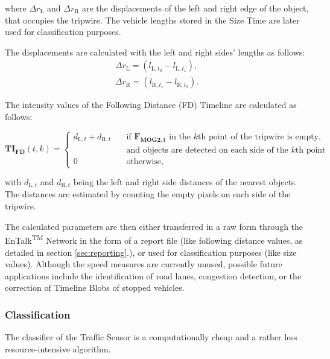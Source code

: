 where $\Delta r_{\text{L}}$ and $\Delta r_{\text{R}}$ are the displacements of the left and right edge of the object, that occupies the tripwire.
The vehicle lengths stored in the Size Time are later used for classification purposes.

The displacements are calculated with the left and right sides' lengths as follows:
\begin{gather*}
\Delta r_{\text{L}} = \left( l_{\text{L},t_0} - l_{\text{L},t_1} \right),  \\
\Delta r_{\text{R}} = \left( l_{\text{R},t_1} - l_{\text{R},t_0}\right).
\end{gather*}

The intensity values of the Following Distance (FD) Timeline are calculated as follows:

\begin{displaymath}
\boldsymbol{TI_{\text{FD}}}(t,k) = 
\begin{cases}
d_{\text{L},t} + d_{\text{R},t} 		& \quad \text{if } \boldsymbol{F_{\text{MOG2},t}} \text{ in the } k\text{th} \text{ point of the tripwire is empty,} \\ & \quad \text{and objects are detected on each side of the } k \text{th point}\\
0		& \quad \text{otherwise},
\end{cases}
\end{displaymath}

with $d_{\text{L},t}$ and $d_{\text{R},t}$ being the left and right side distances of the nearest objects.
The distances are estimated by counting the empty pixels on each side of the tripwire.

The calculated parameters are then either transferred in a raw form through the EnTalk\textsuperscript{TM} Network in the form of a report file (like following distance values, as detailed in section \ref{sec:reporting}.), or used for classification purposes (like size values).
Although the speed measures are currently unused, possible future applications include the identification of road lanes, congestion detection, or the correction of Timeline Blobs of stopped vehicles.

\subsubsection{Classification}\label{sec:classification}
The classifier of the Traffic Sensor is a computationally cheap and a rather less resource-intensive algorithm.

